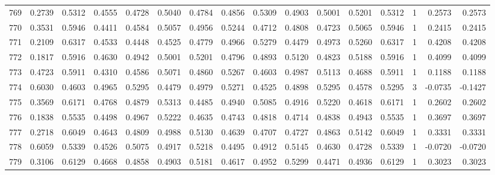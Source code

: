 \begin{tabular}{lrrrrrrrrrrrrrrr}
769 &      0.2739 &  0.5312 &  0.4555 &  0.4728 &  0.5040 &  0.4784 &  0.4856 &  0.5309 &  0.4903 &  0.5001 &   0.5201 &     0.5312 &      1 &                    0.2573 &                     0.2573 \\
770 &      0.3531 &  0.5946 &  0.4411 &  0.4584 &  0.5057 &  0.4956 &  0.5244 &  0.4712 &  0.4808 &  0.4723 &   0.5065 &     0.5946 &      1 &                    0.2415 &                     0.2415 \\
771 &      0.2109 &  0.6317 &  0.4533 &  0.4448 &  0.4525 &  0.4779 &  0.4966 &  0.5279 &  0.4479 &  0.4973 &   0.5260 &     0.6317 &      1 &                    0.4208 &                     0.4208 \\
772 &      0.1817 &  0.5916 &  0.4630 &  0.4942 &  0.5001 &  0.5201 &  0.4796 &  0.4893 &  0.5120 &  0.4823 &   0.5188 &     0.5916 &      1 &                    0.4099 &                     0.4099 \\
773 &      0.4723 &  0.5911 &  0.4310 &  0.4586 &  0.5071 &  0.4860 &  0.5267 &  0.4603 &  0.4987 &  0.5113 &   0.4688 &     0.5911 &      1 &                    0.1188 &                     0.1188 \\
774 &      0.6030 &  0.4603 &  0.4965 &  0.5295 &  0.4479 &  0.4979 &  0.5271 &  0.4525 &  0.4898 &  0.5295 &   0.4578 &     0.5295 &      3 &                   -0.0735 &                    -0.1427 \\
775 &      0.3569 &  0.6171 &  0.4768 &  0.4879 &  0.5313 &  0.4485 &  0.4940 &  0.5085 &  0.4916 &  0.5220 &   0.4618 &     0.6171 &      1 &                    0.2602 &                     0.2602 \\
776 &      0.1838 &  0.5535 &  0.4498 &  0.4967 &  0.5222 &  0.4635 &  0.4743 &  0.4818 &  0.4714 &  0.4838 &   0.4943 &     0.5535 &      1 &                    0.3697 &                     0.3697 \\
777 &      0.2718 &  0.6049 &  0.4643 &  0.4809 &  0.4988 &  0.5130 &  0.4639 &  0.4707 &  0.4727 &  0.4863 &   0.5142 &     0.6049 &      1 &                    0.3331 &                     0.3331 \\
778 &      0.6059 &  0.5339 &  0.4526 &  0.5075 &  0.4917 &  0.5218 &  0.4495 &  0.4912 &  0.5145 &  0.4630 &   0.4728 &     0.5339 &      1 &                   -0.0720 &                    -0.0720 \\
779 &      0.3106 &  0.6129 &  0.4668 &  0.4858 &  0.4903 &  0.5181 &  0.4617 &  0.4952 &  0.5299 &  0.4471 &   0.4936 &     0.6129 &      1 &                    0.3023 &                     0.3023 \\

\end{tabular}

